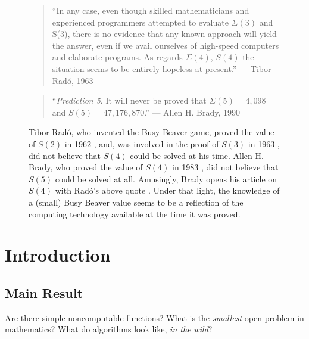 \documentclass[a4paper,british]{article}
\theoremstyle{definition} %
\numberwithin{equation}{section}
\theoremstyle{definition} %
\newcommand{\BBtheFifth}{47{,}176{,}870}
\newcommand{\SigmaTheFifth}{4{,}098}
\newcommand{\radofull}{Tibor Rad\'o\xspace}
\newcommand{\rado}{Rad\'o\xspace}
\begin{document}
\begin{figure}
    \begin{quote}
        ``In any case, even though skilled mathematicians and experienced programmers attempted to evaluate $\Sigma(3)$ and S(3), there is no evidence that any known approach will yield the answer, even if we avail ourselves of high-speed computers and elaborate programs. As regards $\Sigma(4)$, $S(4)$ the situation seems to be entirely hopeless at present.'' --- \radofull, 1963 \cite{Rado_1963}
    \end{quote}
    \begin{quote}
        ``\textit{Prediction 5}. It will never be proved that $\Sigma(5) = \SigmaTheFifth$ and $S(5) = \BBtheFifth$.'' --- Allen H. Brady, 1990 \cite{BradyMeaningOfLife}
    \end{quote}
    \caption{\radofull, who invented the Busy Beaver game, proved the value of $S(2)$ in 1962 \cite{Rado_1962}, and, was involved in the proof of $S(3)$ in 1963 \cite{Lin1963}, did not believe that $S(4)$ could be solved at his time. Allen H. Brady, who proved the value of $S(4)$ in 1983 \cite{Brady83}, did not believe that $S(5)$ could be solved at all. Amusingly, Brady opens his article on $S(4)$ with \rado's above quote \cite{Brady83}. Under that light, the knowledge of a (small) Busy Beaver value seems to be a reflection of the computing technology available at the time it was proved.}\label{fig:hope}
\end{figure}

\vspace{-40pt}

\section{Introduction}\label{sec:intro}

\subsection{Main Result}\label{sec:intro:mainresults}

\newcommand{\noncomput}{noncomputable\xspace}
\newcommand{\BBfull}{Busy Beaver\xspace}
\newcommand{\Coq}{Coq\xspace}
\newcommand{\CoqProofReleaseURL}{\url{https://github.com/ccz181078/Coq-BB5}}

\newcommand{\ie}{i.e.~}
\newcommand{\eg}{e.g.~}

Are there simple \noncomput functions? What is the \textit{smallest} open problem in mathematics? What do algorithms look like, \textit{in the wild}?
\end{document}
